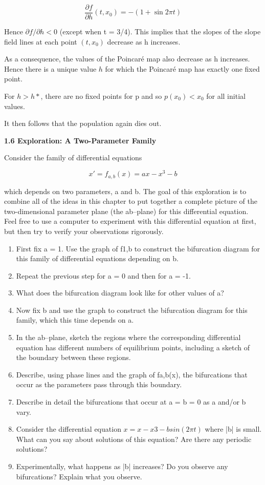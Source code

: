 \documentclass[12pt]{article}
\begin{document}
\[
\frac{\partial f}{\partial h}(t, x_0) = -(1 + \sin 2 \pi t)
\]


Hence $\partial f / \partial h < 0$ (except when t = 3/4). This implies that the slopes of the slope field lines at each point $(t, x_0)$ decrease as h increases. 

As a consequence, the values of the Poincaré map also decrease as h increases. Hence there is a unique value $h$ for which the Poincaré map has exactly one fixed point.

For $h > h\ast$, there are no fixed points for p and so $p(x_0) < x_0$ for all initial values.

It then follows that the population again dies out.

\hfill

\textbf{1.6 Exploration: A Two-Parameter
Family}

\hfill

Consider the family of differential equations

\[
x' = f_{a,b}(x) = ax - x^3 - b
\]

which depends on two parameters, a and b. The goal of this exploration is
to combine all of the ideas in this chapter to put together a complete picture
of the two-dimensional parameter plane (the ab–plane) for this differential
equation. Feel free to use a computer to experiment with this differential
equation at first, but then try to verify your observations rigorously.

\begin{enumerate}
\item First fix a = 1. Use the graph of f1,b to construct the bifurcation diagram
for this family of differential equations depending on b.
\item Repeat the previous step for a = 0 and then for a = -1.
\item What does the bifurcation diagram look like for other values of a?
\item Now fix b and use the graph to construct the bifurcation diagram for this
family, which this time depends on a.
\item In the ab–plane, sketch the regions where the corresponding differential
equation has different numbers of equilibrium points, including a sketch
of the boundary between these regions.
\item Describe, using phase lines and the graph of fa,b(x), the bifurcations that
occur as the parameters pass through this boundary.
\item Describe in detail the bifurcations that occur at a = b = 0 as a and/or b
vary.

\item Consider the differential equation $x = x - x3 - b sin(2 \pi t)$ where |b| is
small. What can you say about solutions of this equation? Are there any
periodic solutions?
\item Experimentally, what happens as |b| increases? Do you observe any
bifurcations? Explain what you observe.
\end{enumerate}
\end{document}
